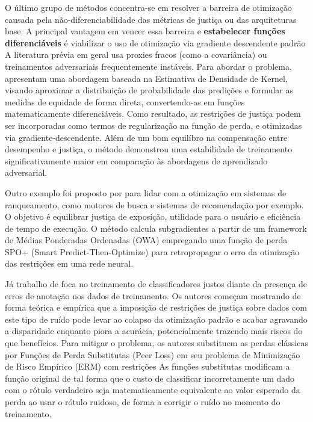 O último grupo de métodos concentra-se em resolver a barreira de otimização causada pela não-diferenciabilidade das métricas de justiça ou das arquiteturas base. A principal vantagem em vencer essa barreira e \textbf{estabelecer funções diferenciáveis} é viabilizar o uso de otimização via gradiente descendente padrão
A literatura prévia em geral usa proxies fracos (como a covariância) ou treinamentos adversariais frequentemente instáveis. Para abordar o problema, \citet{cho2020fair} apresentam uma abordagem baseada na Estimativa de Densidade de Kernel, visando aproximar a distribuição de probabilidade das predições e formular as medidas de equidade de forma direta, convertendo-as em funções matematicamente diferenciáveis. Como resultado, as restrições de justiça podem ser incorporadas como termos de regularização na função de perda, e otimizadas via gradiente-descendente.
Além de um bom equilíbro na compensação entre desempenho e justiça, o método demonstrou uma estabilidade de treinamento significativamente maior em comparação às abordagens de aprendizado adversarial.

Outro exemplo foi proposto por \citet{dinh2024learning} para lidar com a otimização em sistemas de ranqueamento, como motores de busca e sistemas de recomendação por exemplo. O objetivo é equilibrar justiça de exposição, utilidade para o usuário e eficiência de tempo de execução. O método calcula subgradientes a partir de um framework de Médias Ponderadas Ordenadas (OWA) empregando uma função de perda SPO+ (Smart Predict-Then-Optimize) para retropropagar o erro da otimização das restrições em uma rede neural.

Já trabalho de \citet{wang2021fair} foca no treinamento de classificadores justos diante da presença de erros de anotação nos dados de treinamento. Os autores começam mostrando de forma teórica e empírica que a imposição de restrições de justiça sobre dados com este tipo de ruído pode levar ao colapso da otimização padrão e acabar agravando a disparidade enquanto piora a acurácia, potencialmente trazendo mais riscos do que benefícios. Para mitigar o problema, os autores substituem as perdas clássicas por Funções de Perda Substitutas (Peer Loss) em seu problema de Minimização de Risco Empírico (ERM) com restrições
As funções substitutas modificam a função original de tal forma que o custo de classificar incorretamente um dado com o rótulo verdadeiro seja matematicamente equivalente ao valor esperado da perda ao usar o rótulo ruidoso, de forma a corrigir o ruído no momento do treinamento.

